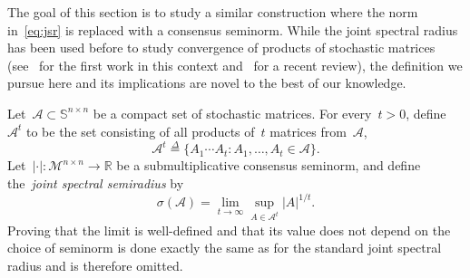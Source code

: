 \documentclass[letterpaper, 10 pt, conference]{ieeeconf}  %
\newcommand{\R}{\mathbb R}
\newcommand{\dfb}{\stackrel{\Delta}{=}}
\newcommand{\gensn}[1]{|#1|} %
\newcommand{\eqrowsum}{\mathcal{M}} %
\newcommand{\stoc}{\mathbb{S}} %
\newcommand{\semijsr}{\sigma}
\begin{document}
The goal of this section is to study a similar construction where the norm in~\eqref{eq:jsr} is replaced with a consensus seminorm. While the joint spectral radius has been used before to study convergence of products of stochastic matrices (see~\cite{Daubechies1992RCP} for the first work in this context and~\cite{Kozyakin2019ConsensusJSR} for a recent review), the definition we pursue here and its implications are novel to the best of our knowledge.

Let~$\mathcal{A} \subset \stoc^{n \times n}$ be a compact set of stochastic matrices. For every~$t > 0$, define~$\mathcal{A}^t$ to be the set consisting of all products of~$t$ matrices from~$\mathcal{A}$,
\begin{equation}
    \mathcal{A}^t \dfb \{A_1 \cdots A_t : A_1,\dots,A_t \in \mathcal{A}\}.
\end{equation}
Let~$\gensn{\cdot} : \eqrowsum^{n \times n} \to \R$ be a submultiplicative consensus seminorm, and define the~\emph{joint spectral semiradius} by
\begin{equation}\label{eq:semijsr}
    \semijsr(\mathcal{A}) = \lim_{t \to \infty} \sup_{A \in \mathcal{A}^t} \gensn{A}^{1/t}.
\end{equation}
Proving that the limit is well-defined and that its value does not depend on the choice of seminorm is done exactly the same as for the standard joint spectral radius and is therefore omitted.%
\end{document}
